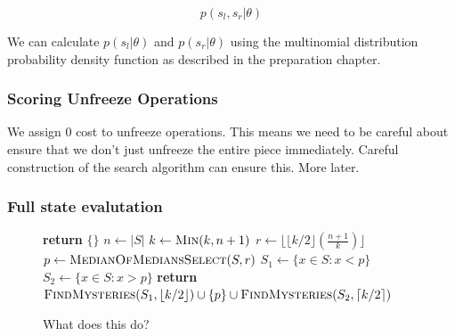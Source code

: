 \documentclass[12pt,a4paper,twoside,openright]{report} \usepackage[pdfborder={0 0 0}]{hyperref}    %
\theoremstyle{definition} \newtheorem{definition}{Definition}[section]
\begin{document}
  \[p(s_l, s_r| \theta)\]

  We can calculate $p(s_l|\theta)$ and $p(s_r|\theta)$ using the multinomial distribution probability density function
  as described in the preparation chapter.

  \FloatBarrier \subsubsection{Scoring Unfreeze Operations} We assign 0 cost to unfreeze operations. This means we need
  to be careful about ensure that we don't just unfreeze the entire piece immediately. Careful construction of the
  search algorithm can ensure this. More later.

  \FloatBarrier \subsubsection{Full state evalutation}

  \begin{figure}[h] \caption{What does this do?}

    \label{code:mystery}

    \begin{algorithmic}[1]   \State \textbf{return} $\{\}$  \EndIf \State $n \gets |S|$  \State $k \gets \Call{Min}{k,
      n + 1}$  \State $r\gets \lfloor \lfloor k/2 \rfloor (\tfrac{n+1}{k})
      \rfloor$  \State $p \gets \Call{MedianOfMediansSelect}{S, r}$
       \State $S_1 \gets \{ x \in S : x < p \}$ \State $S_2 \gets \{ x \in S : x > p \}$
      \State \textbf{return} $\Call{FindMysteries}{S_1, \lfloor k/2 \rfloor} \cup\{ p \} \cup \Call{FindMysteries}{S_2,
      \lceil k/2 \rceil}$ \EndFunction \end{algorithmic}

    \end{figure}

\end{document}
